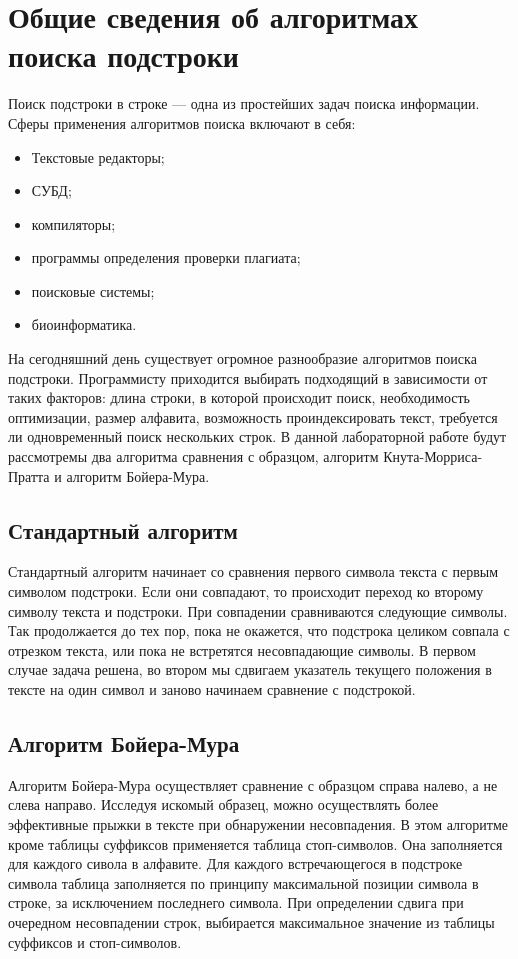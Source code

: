 \documentclass[12pt]{report}
\begin{document}
\section{Общие сведения об алгоритмах поиска подстроки}
\par
Поиск подстроки в строке — одна из простейших задач поиска информации. Сферы применения алгоритмов поиска включают в себя:
\begin{itemize}
	\item Текстовые редакторы;
	\item СУБД;
	\item компиляторы;
	\item программы определения проверки плагиата;
	\item поисковые системы;
	\item биоинформатика.
\end{itemize}
На сегодняшний день существует огромное разнообразие алгоритмов поиска подстроки. Программисту приходится выбирать подходящий в зависимости от таких факторов: длина строки, в которой происходит поиск, необходимость оптимизации, размер алфавита, возможность проиндексировать текст, требуется ли одновременный поиск нескольких строк.  В данной лабораторной работе будут рассмотремы два алгоритма сравнения с образцом, алгоритм Кнута-Морриса-Пратта и алгоритм Бойера-Мура.
\subsection{Стандартный алгоритм}
Стандартный алгоритм начинает со сравнения первого символа текста с первым символом подстроки. Если они совпадают, то происходит переход ко второму символу текста и подстроки. При совпадении сравниваются следующие символы. Так продолжается до тех пор, пока не окажется, что подстрока целиком совпала с отрезком текста, или пока не встретятся несовпадающие символы. В первом случае задача решена, во втором мы сдвигаем указатель текущего положения в тексте на один символ и заново начинаем сравнение с подстрокой\cite{2}.

\subsection{Алгоритм Бойера-Мура}
Алгоритм Бойера-Мура осуществляет сравнение с образцом справа налево, а не слева направо. Исследуя искомый образец, можно осуществлять более эффективные прыжки в тексте при обнаружении несовпадения. В этом алгоритме кроме таблицы суффиксов применяется таблица стоп-символов. Она заполняется для каждого сивола в алфавите. Для каждого встречающегося в подстроке символа таблица заполняется по принципу максимальной позиции символа в строке, за исключением последнего символа. При определении сдвига при очередном несовпадении строк, выбирается максимальное значение из таблицы суффиксов и стоп-символов\cite{2}.
\end{document}
